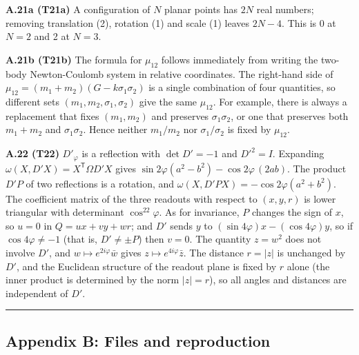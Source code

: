 \documentclass[
  a4paper,
]{article}
\begin{document}
\textbf{A.21a (T21a)} A configuration of \(N\) planar points has \(2N\)
real numbers; removing translation (2), rotation (1) and scale (1)
leaves \(2N-4\). This is 0 at \(N=2\) and 2 at \(N=3\).

\textbf{A.21b (T21b)} The formula for \(\mu_{12}\) follows immediately
from writing the two-body Newton-Coulomb system in relative coordinates.
The right-hand side of \(\mu_{12}=(m_1+m_2)(G-k\sigma_1\sigma_2)\) is a
single combination of four quantities, so different sets
\((m_1,m_2,\sigma_1,\sigma_2)\) give the same \(\mu_{12}\). For example,
there is always a replacement that fixes \((m_1,m_2)\) and preserves
\(\sigma_1\sigma_2\), or one that preserves both \(m_1+m_2\) and
\(\sigma_1\sigma_2\). Hence neither \(m_1/m_2\) nor
\(\sigma_1/\sigma_2\) is fixed by \(\mu_{12}\).

\textbf{A.22 (T22)} \(D'_\varphi\) is a reflection with \(\det D'=-1\)
and \(D'^2=I\). Expanding \(\omega(X,D'X)=X^{\mathsf T}\Omega D'X\)
gives \(\sin2\varphi(a^2-b^2)-\cos2\varphi\,(2ab)\). The product \(D'P\)
of two reflections is a rotation, and
\(\omega(X,D'PX)=-\cos2\varphi(a^2+b^2)\). The coefficient matrix of the
three readouts with respect to \((x,y,r)\) is lower triangular with
determinant \(\cos^22\varphi\). As for invariance, \(P\) changes the
sign of \(x\), so \(u=0\) in \(Q=ux+vy+wr\); and \(D'\) sends \(y\) to
\((\sin4\varphi)x-(\cos4\varphi)y\), so if \(\cos4\varphi\neq-1\) (that
is, \(D'\neq\pm P\)) then \(v=0\). The quantity \(z=w^2\) does not
involve \(D'\), and \(w\mapsto e^{2i\varphi}\bar w\) gives
\(z\mapsto e^{4i\varphi}\bar z\). The distance \(r=\lvert z\rvert\) is
unchanged by \(D'\), and the Euclidean structure of the readout plane is
fixed by \(r\) alone (the inner product is determined by the norm
\(\lvert z\rvert=r\)), so all angles and distances are independent of
\(D'\).

\begin{center}\rule{0.5\linewidth}{0.5pt}\end{center}

\subsection{Appendix B: Files and
reproduction}\label{appendix-b-files-and-reproduction}
\end{document}
